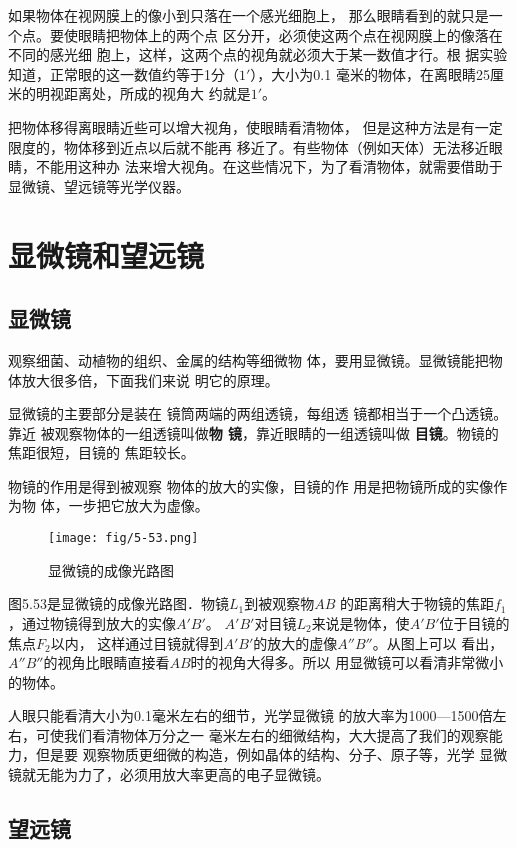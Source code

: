 如果物体在视网膜上的像小到只落在一个感光细胞上，
那么眼睛看到的就只是一个点。要使眼睛把物体上的两个点
区分开，必须使这两个点在视网膜上的像落在不同的感光细
胞上，这样，这两个点的视角就必须大于某一数值才行。根
据实验知道，正常眼的这一数值约等于1分（$1'$），大小为0.1
毫米的物体，在离眼睛25厘米的明视距离处，所成的视角大
约就是$1'$。

把物体移得离眼睛近些可以增大视角，使眼睛看清物体，
但是这种方法是有一定限度的，物体移到近点以后就不能再
移近了。有些物体（例如天体）无法移近眼睛，不能用这种办
法来增大视角。在这些情况下，为了看清物体，就需要借助于
显微镜、望远镜等光学仪器。

\section{显微镜和望远镜}
\subsection{显微镜}

观察细菌、动植物的组织、金属的结构等细微物
体，要用显微镜。显微镜能把物体放大很多倍，下面我们来说
明它的原理。

显微镜的主要部分是装在
镜筒两端的两组透镜，每组透
镜都相当于一个凸透镜。靠近
被观察物体的一组透镜叫做\textbf{物
镜}，靠近眼睛的一组透镜叫做
\textbf{目镜}。物镜的焦距很短，目镜的
焦距较长。

物镜的作用是得到被观察
物体的放大的实像，目镜的作
用是把物镜所成的实像作为物
体，一步把它放大为虚像。

\begin{figure}[htp]\centering
    \texttt{[image: fig/5-53.png]}
    \caption{显微镜的成像光路图}
    \end{figure}

图5.53是显微镜的成像光路图．物镜$L_1$到被观察物$AB$
的距离稍大于物镜的焦距$f_1$，通过物镜得到放大的实像$A'B'$。
$A'B'$对目镜$L_2$来说是物体，使$A'B'$位于目镜的焦点$F_2$以内，
这样通过目镜就得到$A'B'$的放大的虚像$A''B''$。从图上可以
看出，$A''B''$的视角比眼睛直接看$AB$时的视角大得多。所以
用显微镜可以看清非常微小的物体。

人眼只能看清大小为0.1毫米左右的细节，光学显微镜
的放大率为1000—1500倍左右，可使我们看清物体万分之一
毫米左右的细微结构，大大提高了我们的观察能力，但是要
观察物质更细微的构造，例如晶体的结构、分子、原子等，光学
显微镜就无能为力了，必须用放大率更高的电子显微镜。

\subsection{望远镜}

